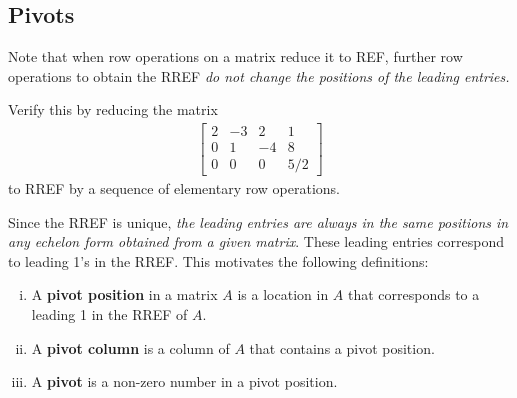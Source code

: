 \documentclass[12pt,letterpaper,reqno]{article}
\numberwithin{equation}{section}
\newcommand{\ti}[1]{\textit{#1}}
\begin{document}
\subsection{Pivots}
Note that when row operations on a matrix reduce it to REF, further row operations to obtain the RREF \ti{do not change the positions of the leading entries.} 

\begin{exercise}
Verify this by reducing the matrix
\begin{align*}
	\begin{bmatrix}
		2 & -3 & 2 & 1 \\
		0 & 1 & -4 & 8 \\
		0 & 0 & 0 & 5/2
	\end{bmatrix}
\end{align*}	
to RREF by a sequence of elementary row operations.
\end{exercise}


Since the RREF is unique, \ti{the leading entries are always in the same positions in any echelon form obtained from a given matrix}. These leading entries correspond to leading 1's in the RREF. This motivates the following definitions:

\begin{defn} \label{def:pivots_pivot_positions_pivot_columns} \hspace{10cm}
	\begin{enumerate}[(i)]
	\item A {\bf pivot position} in a matrix $A$ is a location in $A$ that corresponds to a leading 1 in the RREF of $A$. 
	\item A {\bf pivot column} is a column of $A$ that contains a pivot position.
	\item A {\bf pivot} is a non-zero number in a pivot position.
\end{enumerate}
\end{defn}
\end{document}

